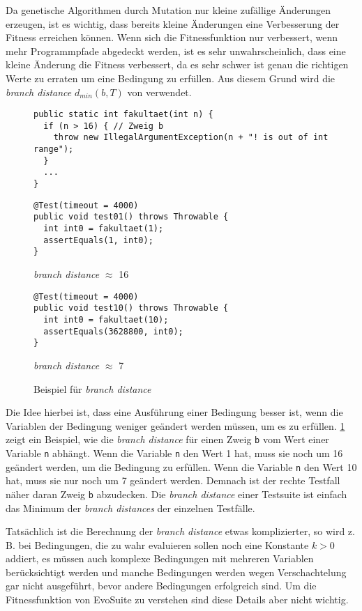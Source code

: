\documentclass[a4paper,11pt]{article}
\begin{document}
Da genetische Algorithmen durch Mutation nur kleine zufällige Änderungen erzeugen, ist es wichtig, dass bereits kleine Änderungen eine Verbesserung der Fitness erreichen können.
Wenn sich die Fitnessfunktion nur verbessert, wenn mehr Programmpfade abgedeckt werden, ist es sehr unwahrscheinlich, dass eine kleine Änderung die Fitness verbessert, da es sehr schwer ist genau die richtigen Werte zu erraten um eine Bedingung zu erfüllen.
Aus diesem Grund wird die \textit{branch distance} $d_{min}(b, T)$ von \citet{10.1109/32.57624} verwendet.

\begin{figure}[h]
	\begin{lstlisting}[basicstyle=\ttfamily\tiny]
public static int fakultaet(int n) {
  if (n > 16) { // Zweig b
    throw new IllegalArgumentException(n + "! is out of int range");
  }
  ...
}
	\end{lstlisting}
	\begin{multicols}{2}
		\begin{lstlisting}[basicstyle=\ttfamily\tiny]
@Test(timeout = 4000)
public void test01() throws Throwable {
  int int0 = fakultaet(1);
  assertEquals(1, int0);
}
		\end{lstlisting}
		\textit{branch distance} $\approx$ 16
		\columnbreak
		\begin{lstlisting}[basicstyle=\ttfamily\tiny]
@Test(timeout = 4000)
public void test10() throws Throwable {
  int int0 = fakultaet(10);
  assertEquals(3628800, int0);
}
		\end{lstlisting}
		\textit{branch distance} $\approx$ 7
	\end{multicols}
	\caption{Beispiel für \textit{branch distance}}
	\label{fig:branch_distance}
\end{figure}

Die Idee hierbei ist, dass eine Ausführung einer Bedingung besser ist, wenn die Variablen der Bedingung weniger geändert werden müssen, um es zu erfüllen.
\cref{fig:branch_distance} zeigt ein Beispiel, wie die \textit{branch distance} für einen Zweig \texttt{b} vom Wert einer Variable \texttt{n} abhängt.
Wenn die Variable \texttt{n} den Wert 1 hat, muss sie noch um 16 geändert werden, um die Bedingung zu erfüllen.
Wenn die Variable \texttt{n} den Wert 10 hat, muss sie nur noch um 7 geändert werden.
Demnach ist der rechte Testfall näher daran Zweig \texttt{b} abzudecken.
Die \textit{branch distance} einer Testsuite ist einfach das Minimum der \textit{branch distances} der einzelnen Testfälle.

Tatsächlich ist die Berechnung der \textit{branch distance} etwas komplizierter, so wird z. B. bei Bedingungen, die zu wahr evaluieren sollen noch eine Konstante $k > 0$ addiert, es müssen auch komplexe Bedingungen mit mehreren Variablen berücksichtigt werden und manche Bedingungen werden wegen Verschachtelung gar nicht ausgeführt, bevor andere Bedingungen erfolgreich sind.
Um die Fitnessfunktion von EvoSuite zu verstehen sind diese Details aber nicht wichtig.
\end{document}
